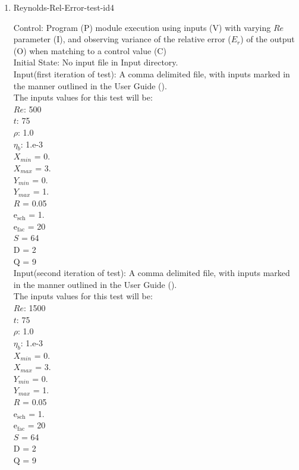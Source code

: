 \documentclass[12pt, titlepage]{article}
\begin{document}
\begin{enumerate}
\item{Reynolds-Rel-Error-test-id4\\}

Control: Program (P) module execution using  inputs (V) with varying $Re$ parameter (I), and observing variance of the relative error ($E_r$) of the output (O) when matching to a control value (C) \\
					
Initial State: No input file in Input directory.\\
					
Input(first iteration of test): A comma delimited file, with inputs marked in the manner outlined in the User Guide (\citet{LBM_UserGuide_PM}).\\The inputs values for this test will be:\\
$Re$: 500\\
$t$: 75\\
$\rho$: 1.0\\
$\eta_b$: 1.e-3\\
$X_{min}$ = 0.\\
$X_{max}$ = 3.\\
$Y_{min}$ = 0.\\
$Y_{max}$ = 1.\\
$R$ = 0.05\\
$\mathrm{e_{sch}}$ = 1.\\
$\mathrm{e_{fac}}$ = 20\\
$S$ = 64\\
$\mathrm{D}$ = 2\\
$\mathrm{Q}$ = 9\\

Input(second iteration of test): A comma delimited file, with inputs marked in the manner outlined in the User Guide (\citet{LBM_UserGuide_PM}).\\The inputs values for this test will be:\\
$Re$: 1500\\
$t$: 75\\
$\rho$: 1.0\\
$\eta_b$: 1.e-3\\
$X_{min}$ = 0.\\
$X_{max}$ = 3.\\
$Y_{min}$ = 0.\\
$Y_{max}$ = 1.\\
$R$ = 0.05\\
$\mathrm{e_{sch}}$ = 1.\\
$\mathrm{e_{fac}}$ = 20\\
$S$ = 64\\
$\mathrm{D}$ = 2\\
$\mathrm{Q}$ = 9\\


\end{enumerate}
\end{document}
